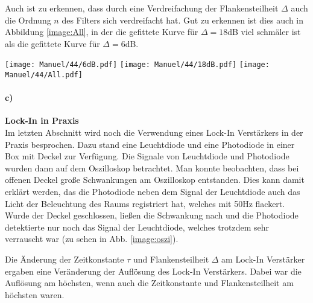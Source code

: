 Auch ist zu erkennen, dass durch eine Verdreifachung der Flankensteilheit $\Delta$ auch die Ordnung $n$ des Filters sich verdreifacht hat. Gut zu erkennen ist dies auch in Abbildung \ref{image:All}, in der die gefittete Kurve für $\Delta=18$dB viel schmäler ist als die gefittete Kurve für $\Delta=6$dB.
\newpage
\begin{center}
    \texttt{[image: Manuel/44/6dB.pdf]}
    \label{image:6dB}
    \vspace{1cm}
    \texttt{[image: Manuel/44/18dB.pdf]}
    \label{image:18dB}
    \vspace{1cm}
    \texttt{[image: Manuel/44/All.pdf]}
    \label{image:All}
\end{center}
\paragraph{c)}\textbf{Lock-In in Praxis}\\
Im letzten Abschnitt wird noch die Verwendung eines Lock-In Verstärkers in der Praxis besprochen. Dazu stand eine Leuchtdiode und eine Photodiode in einer Box mit Deckel zur Verfügung. Die Signale von Leuchtdiode und Photodiode wurden dann auf dem Oszilloskop betrachtet. Man konnte beobachten, dass bei offenen Deckel große Schwankungen am Oszilloskop entstanden. Dies kann damit erklärt werden, das die Photodiode neben dem Signal der Leuchtdiode auch das Licht der Beleuchtung des Raums registriert hat, welches mit 50Hz flackert. Wurde der Deckel geschlossen, ließen die Schwankung nach und die Photodiode detektierte nur noch das Signal der Leuchtdiode, welches trotzdem sehr verrauscht war (zu sehen in Abb. \ref{image:oszi}). 

Die Änderung der Zeitkonstante $\tau$ und Flankensteilheit $\Delta$ am Lock-In Verstärker ergaben eine Veränderung der Auflösung des Lock-In Verstärkers. Dabei war die Auflösung am höchsten, wenn auch die Zeitkonstante und Flankensteilheit am höchsten waren.